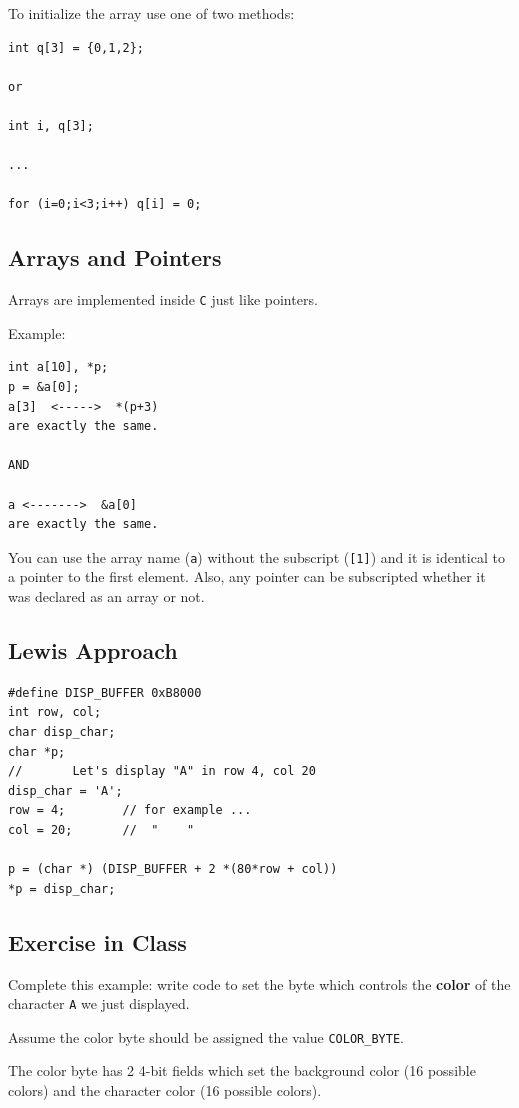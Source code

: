 \documentclass{article}	%
\begin{document}
To initialize the array use one of two methods:
\begin{verbatim}
int q[3] = {0,1,2};

or

int i, q[3];

...

for (i=0;i<3;i++) q[i] = 0;
\end{verbatim}


\subsection{Arrays and Pointers}
Arrays are implemented inside {\tt C} just like pointers.

Example:
\begin{verbatim}
int a[10], *p;
p = &a[0];
a[3]  <----->  *(p+3)
are exactly the same.

AND

a <------->  &a[0]
are exactly the same.
\end{verbatim}
You can use the array name ({\tt a}) without the subscript
({\tt [1]}) and it is identical to a pointer to the first element.
Also, any pointer can be
subscripted whether it was declared as an array or not.


\subsection*{Lewis Approach}

\begin{verbatim}
#define DISP_BUFFER 0xB8000
int row, col;
char disp_char;
char *p;
//       Let's display "A" in row 4, col 20
disp_char = 'A';
row = 4;        // for example ...
col = 20;       //  "    "

p = (char *) (DISP_BUFFER + 2 *(80*row + col))
*p = disp_char;
\end{verbatim}


\subsection{Exercise in Class}
 Complete this example: write code to
 set the byte which controls the {\bf color}
 of the character {\tt A} we just displayed.

 Assume the color byte should be
 assigned the value {\tt COLOR\_BYTE}.

 The color byte has 2 4-bit fields which	%
set the background color (16 possible colors)
and the character color (16 possible colors).
\end{document}
